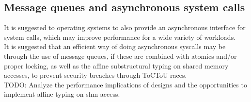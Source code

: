 \subsection{Message queues and asynchronous system calls}
It is suggested to operating systems to also provide an asynchronous interface for system calls, which may improve performance for a wide variety of workloads.\\
It is suggested that an efficient way of doing asynchronous syscalls may be through the use of message queues, if these are combined with atomics and/or proper locking, as well as the affine substructural typing on shared memory accesses, to prevent security breaches through ToCToU races.\\
TODO: Analyze the performance implications of designs and the opportunities to implement affine typing on shm access.